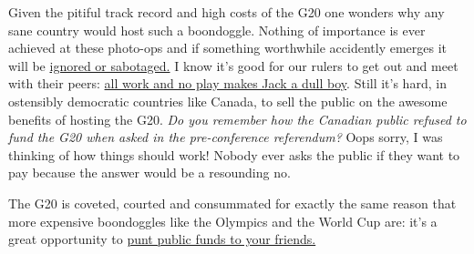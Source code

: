 Given the pitiful track record and high costs of the G20 one wonders why
any sane country would host such a boondoggle. Nothing of importance is
ever achieved at these photo-ops and if something worthwhile accidently
emerges it will be
\href{http://www.globaltradealert.org/gta-analysis/broken-promises-g20-summit-report-global-trade-alert}{ignored
or sabotaged.} I know it's good for our rulers to get out and meet with
their peers: \href{http://www.youtube.com/watch?v=NgMdz2fe0CY}{all work
and no play makes Jack a dull boy}. Still it's hard, in ostensibly
democratic countries like Canada, to sell the public on the awesome
benefits of hosting the G20. \emph{Do you remember how the Canadian
public refused to fund the G20 when asked in the pre-conference
referendum?} Oops sorry, I was thinking of how things should work!
Nobody ever asks the public if they want to pay because the answer would
be a resounding no.

The G20 is coveted, courted and consummated for exactly the same reason
that more expensive boondoggles like the Olympics and the World Cup are:
it's a great opportunity to
\href{http://www.nationalpost.com/Clement+riding+stuffed+with+cash+Liberals/3163957/story.html}{punt
public funds to your friends.}




%